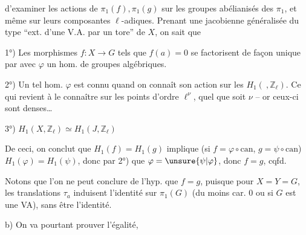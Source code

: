 d'examiner les actions de $\pi_1(f),\pi_1(g)$ sur les groupes abélianisés des $\pi_1$, et même sur leurs composantes $\ell$-adiques. Prenant une jacobienne généralisée du type ``ext. d'une V.A. par un tore'' de $X$, on sait que

1°) Les morphismes $f:X\longrightarrow G$ tels que $f(a)=0$ se factorisent de façon unique par
avec $\varphi$ un hom. de groupes algébriques.

2°)  Un tel hom. $\varphi$ est connu quand on connaît son action sur les $H_1(\ ,\mathbb Z_\ell)$. Ce qui revient à le connaître sur les points d'ordre $\ell^\nu$, quel que soit $\nu$ -- or ceux-ci sont denses\ldots

3°) $H_1(X,\mathbb Z_\ell)\simeq H_1(J,\mathbb Z_\ell)$

De ceci,  on conclut  que $H_1(f)=H_1(g)$ implique (si $f=\varphi\circ\mathrm{can}$, $g=\psi\circ\mathrm{can}$) $H_1(\varphi)=H_1(\psi)$, donc par 2°) que $\varphi=\unsure{\psi|\varphi}$, donc $f=g$, cqfd.

 Notons que l'on ne peut conclure de l'hyp.  que $f=g$, puisque pour $X=Y=G$, les translations $\tau_a$ induisent l'identité sur $\pi_1(G)$ (du moins  car. $0$ ou si $G$ est une VA), sans être l'identité.

b) On va pourtant prouver l'égalité,
